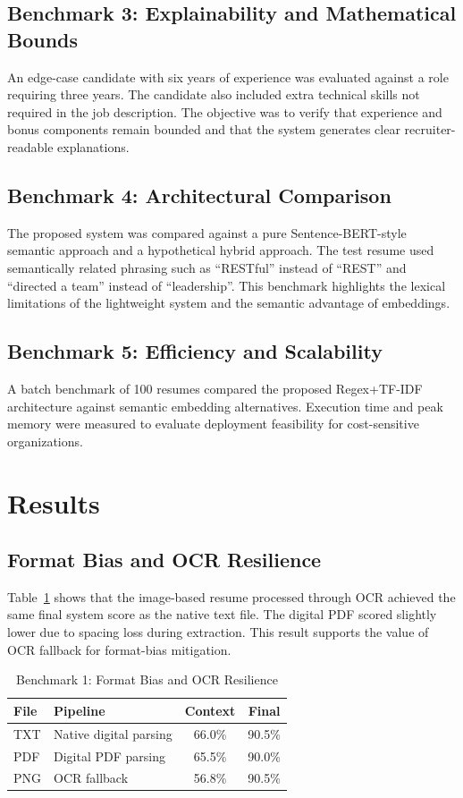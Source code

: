 \documentclass[conference]{IEEEtran}
\begin{document}
\subsection{Benchmark 3: Explainability and Mathematical Bounds}
An edge-case candidate with six years of experience was evaluated against a role requiring three years. The candidate also included extra technical skills not required in the job description. The objective was to verify that experience and bonus components remain bounded and that the system generates clear recruiter-readable explanations.

\subsection{Benchmark 4: Architectural Comparison}
The proposed system was compared against a pure Sentence-BERT-style semantic approach and a hypothetical hybrid approach. The test resume used semantically related phrasing such as ``RESTful'' instead of ``REST'' and ``directed a team'' instead of ``leadership''. This benchmark highlights the lexical limitations of the lightweight system and the semantic advantage of embeddings.

\subsection{Benchmark 5: Efficiency and Scalability}
A batch benchmark of 100 resumes compared the proposed Regex+TF-IDF architecture against semantic embedding alternatives. Execution time and peak memory were measured to evaluate deployment feasibility for cost-sensitive organizations.

\section{Results}
\subsection{Format Bias and OCR Resilience}
Table~\ref{tab:format} shows that the image-based resume processed through OCR achieved the same final system score as the native text file. The digital PDF scored slightly lower due to spacing loss during extraction. This result supports the value of OCR fallback for format-bias mitigation.

\begin{table}[t]
\centering
\caption{Benchmark 1: Format Bias and OCR Resilience}
\label{tab:format}
\small
\begin{tabularx}{\columnwidth}{p{}p{}cc}
\toprule
\textbf{File} & \textbf{Pipeline} & \textbf{Context} & \textbf{Final}\\
\midrule
TXT & Native digital parsing & 66.0\% & 90.5\%\\
PDF & Digital PDF parsing & 65.5\% & 90.0\%\\
PNG & OCR fallback & 56.8\% & 90.5\%\\
\bottomrule
\end{tabularx}
\end{table}
\end{document}
